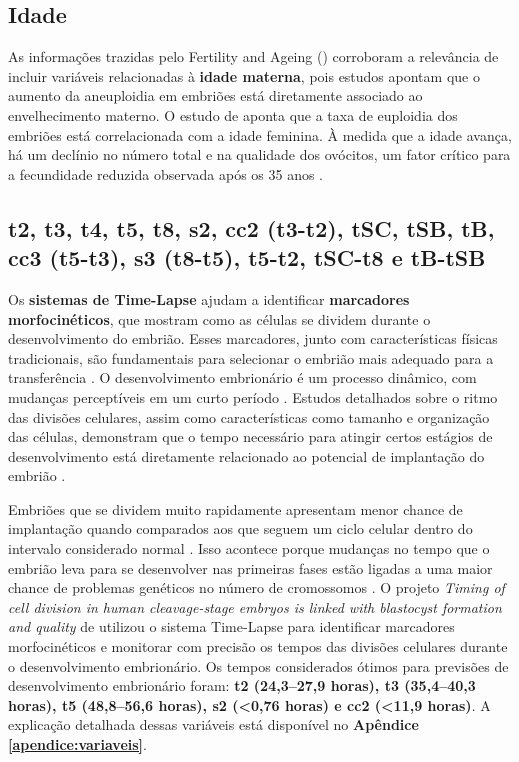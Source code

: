 \subsection{Idade}

As informações trazidas pelo Fertility and Ageing () corroboram a relevância de incluir variáveis relacionadas à \textbf{idade materna}, pois estudos apontam que o aumento da aneuploidia em embriões está diretamente associado ao envelhecimento materno. O estudo de  aponta que a taxa de euploidia dos embriões está correlacionada com a idade feminina. À medida que a idade avança, há um declínio no número total e na qualidade dos ovócitos, um fator crítico para a fecundidade reduzida observada após os 35 anos \cite{yuan2023}.

\subsection{t2, t3, t4, t5, t8, s2, cc2 (t3-t2), tSC, tSB, tB, cc3 (t5-t3), s3 (t8-t5), t5-t2,  tSC-t8 e tB-tSB}

Os \textbf{sistemas de Time-Lapse} ajudam a identificar \textbf{marcadores morfocinéticos}, que mostram como as células se dividem durante o desenvolvimento do embrião. Esses marcadores, junto com características físicas tradicionais, são fundamentais para selecionar o embrião mais adequado para a transferência \cite{souzarebeca2022}. O desenvolvimento embrionário é um processo dinâmico, com mudanças perceptíveis em um curto período \cite{cruz2012}. Estudos detalhados sobre o ritmo das divisões celulares, assim como características como tamanho e organização das células, demonstram que o tempo necessário para atingir certos estágios de desenvolvimento está diretamente relacionado ao potencial de implantação do embrião \cite{souzarebeca2022}.

Embriões que se dividem muito rapidamente apresentam menor chance de implantação quando comparados aos que seguem um ciclo celular dentro do intervalo considerado normal \cite{cruz2012}. Isso acontece porque mudanças no tempo que o embrião leva para se desenvolver nas primeiras fases estão ligadas a uma maior chance de problemas genéticos no número de cromossomos \cite{cruz2012}. O projeto \textit{Timing of cell division in human cleavage-stage embryos is linked with blastocyst formation and quality} de  utilizou o sistema Time-Lapse para identificar marcadores morfocinéticos e monitorar com precisão os tempos das divisões celulares durante o desenvolvimento embrionário. Os tempos considerados ótimos para previsões de desenvolvimento embrionário foram: \textbf{t2 (24,3{–}27,9 horas), t3 (35,4{–}40,3 horas), t5 (48,8{–}56,6 horas), s2 (<0,76 horas) e cc2 (<11,9 horas)}. A explicação detalhada dessas variáveis está disponível no \textbf{Apêndice \ref{apendice:variaveis}}.


